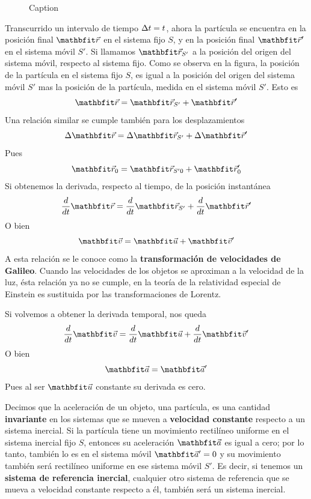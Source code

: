 \begin{figure}
{
    }
    \caption{Caption}
    \label{fig:enter-label}
\end{figure}

Transcurrido un intervalo de tiempo $\Delta t = t$, ahora la partícula se encuentra en la posición final $\vecr$ en el sistema fijo $S$, y en la posición final $\vecr'$ en el sistema móvil $S'$. Si llamamos $\vecr_{S'}$ a la posición del origen del sistema móvil, respecto al sistema fijo. Como se observa en la figura, la posición de la partícula en el sistema fijo $S$, es igual a la posición del origen del sistema móvil $S'$ mas la posición de la partícula, medida en el sistema móvil $S'$. Esto es
$$\vecr = \vecr_{S'} + \vecr'$$
Una relación similar se cumple también para los desplazamientos
$$\Deltar = \Deltar_{S'} + \Deltar'$$
Pues
$$\vecr_0 = \vecr_{S'0} + \vecr_0'$$
Si obtenemos la derivada, respecto al tiempo, de la posición instantánea
$$\frac{d}{dt}\vecr = \frac{d}{dt}\vecr_{S'} + \frac{d}{dt}\vecr'$$
O bien
$$\veloi = \velou + \veloi'$$
A esta relación se le conoce como la \textbf{transformación de velocidades de Galileo}. Cuando las velocidades de los objetos se aproximan a la velocidad de la luz, ésta relación ya no se cumple, en la teoría de la relatividad especial de Einstein es sustituida por las transformaciones de Lorentz.

Si volvemos a obtener la derivada temporal, nos queda
$$\frac{d}{dt}\veloi = \frac{d}{dt}\velou + \frac{d}{dt}\veloi'$$
O bien
$$\acei = \acei'$$
Pues al ser $\velou$ constante su derivada es cero.

Decimos que la aceleración de un objeto, una partícula, es una cantidad \textbf{invariante} en los sistemas que se mueven a \textbf{velocidad constante} respecto a un sistema inercial. Si la partícula tiene un movimiento rectilíneo uniforme en el sistema inercial fijo $S$, entonces su aceleración $\acei$ es igual a cero; por lo tanto, también lo es en el sistema móvil $\acei' = 0$ y su movimiento también será rectilíneo uniforme en ese sistema móvil $S'$. Es decir, si tenemos un \textbf{sistema de referencia inercial}, cualquier otro sistema de referencia que se mueva a velocidad constante respecto a él, también será un sistema inercial.

